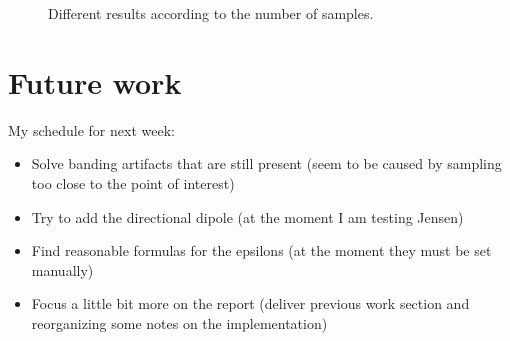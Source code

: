 \documentclass[12pt, twoside,a4paper]{article}
\begin{document}
\begin{figure}
\centering
{} 
\caption{Different results according to the number of samples. }
\label{fig:img}
\end{figure}


\section{Future work}
My schedule for next week:
\begin{itemize}
	\item Solve banding artifacts that are still present (seem to be caused by sampling too close to the point of interest)
	\item Try to add the directional dipole (at the moment I am testing Jensen)
	\item Find reasonable formulas for the epsilons (at the moment they must be set manually)
	\item Focus a little bit more on the report (deliver previous work section and reorganizing some notes on the implementation)
\end{itemize}
\end{document}
